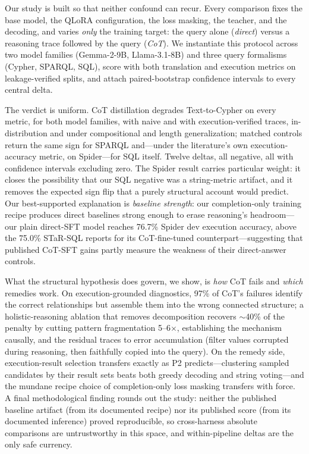\documentclass[11pt]{article}
\begin{document}
Our study is built so that neither confound can recur. Every comparison fixes the base
model, the QLoRA configuration, the loss masking, the teacher, and the decoding, and varies
\emph{only} the training target: the query alone (\emph{direct}) versus a reasoning trace followed
by the query (\emph{CoT}). We instantiate this protocol across two model families (Gemma-2-9B,
Llama-3.1-8B) and three query formalisms (Cypher, SPARQL, SQL), score with both translation and
execution metrics on leakage-verified splits, and attach paired-bootstrap confidence intervals to
every central delta.

The verdict is uniform. CoT distillation degrades Text-to-Cypher on every metric, for both model
families, with naive and with execution-verified traces, in-distribution and under compositional
and length generalization; matched controls return the same sign for SPARQL and---under the
literature's own execution-accuracy metric, on Spider---for SQL itself. Twelve deltas, all
negative, all with confidence intervals excluding zero. The Spider result carries particular
weight: it closes the possibility that our SQL negative was a string-metric artifact, and it
removes the expected sign flip that a purely structural account would predict. Our best-supported
explanation is \emph{baseline strength}: our completion-only training recipe produces direct
baselines strong enough to erase reasoning's headroom---our plain direct-SFT model reaches 76.7\%
Spider dev execution accuracy, above the 75.0\% STaR-SQL reports for its CoT-fine-tuned
counterpart---suggesting that published CoT-SFT gains partly measure the weakness of their
direct-answer controls.

What the structural hypothesis does govern, we show, is \emph{how} CoT fails and \emph{which}
remedies work. On execution-grounded diagnostics, 97\% of CoT's failures identify the correct
relationships but assemble them into the wrong connected structure; a holistic-reasoning ablation
that removes decomposition recovers $\sim$40\% of the penalty by cutting pattern fragmentation
5--6$\times$, establishing the mechanism causally, and the residual traces to error accumulation
(filter values corrupted during reasoning, then faithfully copied into the query). On the remedy
side, execution-result selection transfers exactly as P2 predicts---clustering sampled candidates
by their result sets beats both greedy decoding and string voting---and the mundane recipe choice
of completion-only loss masking transfers with force. A final methodological finding rounds out the
study: neither the published baseline artifact (from its documented recipe) nor its published score
(from its documented inference) proved reproducible, so cross-harness absolute comparisons are
untrustworthy in this space, and within-pipeline deltas are the only safe currency.
\end{document}
